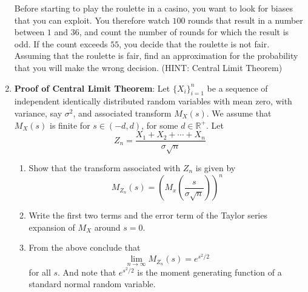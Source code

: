\documentclass{article}
\newcommand{\Rb}{\mathbb{R}}
\newcommand{\bkt}[1]{\left(#1\right)}
\begin{document}
\begin{enumerate}
		Before starting to play the roulette in a casino, you want to look for biases that you can exploit. You therefore watch $100$ rounds that result in a number between $1$ and $36$, and count the number of rounds for which the result is odd. If the count exceeds $55$, you decide that the roulette is not fair. Assuming that the roulette is fair, find an approximation for the probability that you will make the wrong decision. (HINT: Central Limit Theorem)
		\item
		\textbf{Proof of Central Limit Theorem}: Let $\{X_i\}_{i=1}^n$ be a sequence of independent identically distributed random variables with mean zero, with variance, say $\sigma^2$, and associated transform $M_X(s)$. We assume that $M_X(s)$ is finite for $s \in \bkt{-d,d}$, for some $d \in \Rb^+$. Let
		$$Z_n = \dfrac{X_1+X_2+\cdots+X_n}{\sigma \sqrt{n}}$$
		\begin{enumerate}
			\item
			Show that the transform associated with $Z_n$ is given by
			$$M_{Z_n}(s) = \bkt{M_x\bkt{\dfrac{s}{\sigma\sqrt{n}}}}^n$$
			\item
			Write the first two terms and the error term of the Taylor series expansion of $M_X$ around $s=0$.
			\item
			From the above conclude that
			$$\lim_{n \to \infty} M_{Z_n}(s) = e^{s^2/2}$$
			for all $s$. And note that $e^{s^2/2}$ is the moment generating function of a standard normal random variable.
		\end{enumerate}
	\end{enumerate}
\end{document}
